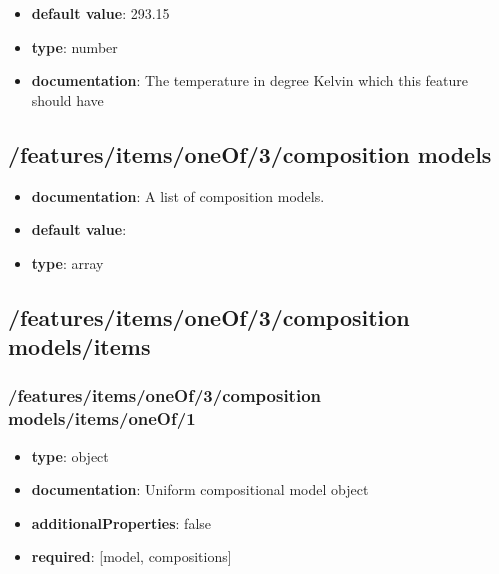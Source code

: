 \begin{itemize}\item {\bf default value}: 293.15
\item {\bf type}: number
\item {\bf documentation}: The temperature in degree Kelvin which this feature should have
\end{itemize}\subsection{/features/items/oneOf/3/composition models}
\begin{itemize}\item {\bf documentation}: A list of composition models.
\item {\bf default value}: 
\item {\bf type}: array
\end{itemize}\subsection{/features/items/oneOf/3/composition models/items}

\subsubsection{/features/items/oneOf/3/composition models/items/oneOf/1}
\begin{itemize}\item {\bf type}: object
\item {\bf documentation}: Uniform compositional model object
\item {\bf additionalProperties}: false
\item {\bf required}: [model, compositions]\end{itemize}
